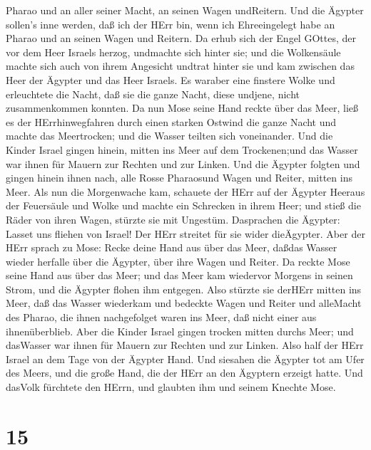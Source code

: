 Pharao und an aller seiner Macht, an seinen Wagen undReitern.
 Und die Ägypter sollen's inne werden, daß ich der HErr
bin, wenn ich Ehreeingelegt habe an Pharao und an seinen Wagen und
Reitern.  Da erhub sich der Engel GOttes, der vor dem Heer
Israels herzog, undmachte sich hinter sie; und die Wolkensäule machte
sich auch von ihrem Angesicht undtrat hinter sie  und kam
zwischen das Heer der Ägypter und das Heer Israels. Es waraber eine
finstere Wolke und erleuchtete die Nacht, daß sie die ganze Nacht, diese
undjene, nicht zusammenkommen konnten.  Da nun Mose seine
Hand reckte über das Meer, ließ es der HErrhinwegfahren durch einen
starken Ostwind die ganze Nacht und machte das Meertrocken; und die
Wasser teilten sich voneinander.  Und die Kinder Israel
gingen hinein, mitten ins Meer auf dem Trockenen;und das Wasser war
ihnen für Mauern zur Rechten und zur Linken.  Und die
Ägypter folgten und gingen hinein ihnen nach, alle Rosse Pharaosund
Wagen und Reiter, mitten ins Meer.  Als nun die Morgenwache
kam, schauete der HErr auf der Ägypter Heeraus der Feuersäule und Wolke
und machte ein Schrecken in ihrem Heer;  und stieß die
Räder von ihren Wagen, stürzte sie mit Ungestüm. Dasprachen die Ägypter:
Lasset uns fliehen von Israel! Der HErr streitet für sie wider
dieÄgypter.  Aber der HErr sprach zu Mose: Recke deine Hand
aus über das Meer, daßdas Wasser wieder herfalle über die Ägypter, über
ihre Wagen und Reiter.  Da reckte Mose seine Hand aus über
das Meer; und das Meer kam wiedervor Morgens in seinen Strom, und die
Ägypter flohen ihm entgegen. Also stürzte sie derHErr mitten ins Meer,
 daß das Wasser wiederkam und bedeckte Wagen und Reiter und
alleMacht des Pharao, die ihnen nachgefolget waren ins Meer, daß nicht
einer aus ihnenüberblieb.  Aber die Kinder Israel gingen
trocken mitten durchs Meer; und dasWasser war ihnen für Mauern zur
Rechten und zur Linken.  Also half der HErr Israel an dem
Tage von der Ägypter Hand. Und siesahen die Ägypter tot am Ufer des
Meers,  und die große Hand, die der HErr an den Ägyptern
erzeigt hatte. Und dasVolk fürchtete den HErrn, und glaubten ihm und
seinem Knechte Mose.

\hypertarget{section-14}{%
\section{15}\label{section-14}}

